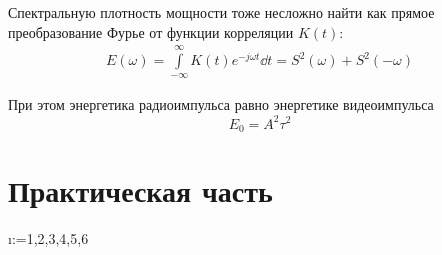 Спектральную плотность мощности тоже несложно найти как прямое преобразование
Фурье от функции корреляции $K(t)$:
\begin{equation}
    \begin{gathered}
        E(\omega) = \int\limits_{-\infty}^{\infty} K(t) e^{-j\omega t} \dd t =
        S^2(\omega) + S^2(- \omega)
    \end{gathered}
\end{equation}


При этом энергетика радиоимпульса равно энергетике видеоимпульса
\begin{equation}
    \label{eq:}
    E_0 = A^2 \tau^2
\end{equation}


\newpage
\section{Практическая часть}

\makeatletter
\@for\i:={1,2,3,4,5,6}\do{ \newpage}
\makeatother






